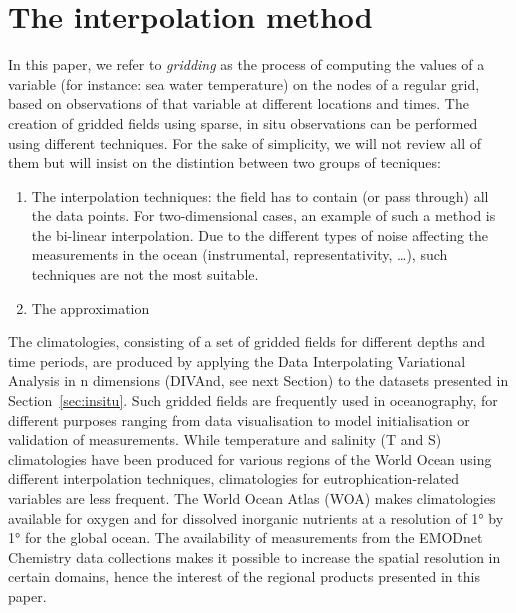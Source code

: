 \documentclass[essd, manuscript]{copernicus}
\begin{document}
\section{The interpolation method}

In this paper, we refer to \textit{gridding} as the process of computing the values of a variable (for instance: sea water temperature) on the nodes of a regular grid, based on observations of that variable at different locations and times.
The creation of gridded fields using sparse, in situ observations can be performed using different techniques. For the sake of simplicity, we will not review all of them but will insist on the distintion between two groups of tecniques:
\begin{enumerate}
\item The interpolation techniques: the field has to contain (or pass through) all the data points. For two-dimensional cases, an example of such a method is the bi-linear interpolation. Due to the different types of noise affecting the measurements in the ocean (instrumental, representativity, \ldots), such techniques are not the most suitable.
\item The approximation 
\end{enumerate}

The climatologies, consisting of a set of gridded fields for different depths and time periods, are produced by applying the Data Interpolating Variational Analysis in n dimensions (DIVAnd, see next Section) to the datasets presented in Section~\ref{sec:insitu}. Such gridded fields are frequently used in oceanography, for different purposes ranging from data visualisation to model initialisation or validation of measurements.  
While temperature and salinity (T and S) climatologies have been produced for various regions of the World Ocean using different interpolation techniques, climatologies for eutrophication-related variables are less frequent. The World Ocean Atlas (WOA) makes climatologies available for oxygen \citep[Dissolved Oxygen, Apparent Oxygen Utilization, and Oxygen Saturation][]{Garcia2024} and for dissolved inorganic nutrients \citep[phosphate, nitrate and nitrate+nitrite, silicate][]{Garcia2024b} at a resolution of 1° by 1° for the global ocean. The availability of measurements from the EMODnet Chemistry data collections makes it  possible to increase the spatial resolution in certain domains, hence the interest of the regional products presented in this paper.

\end{document}
